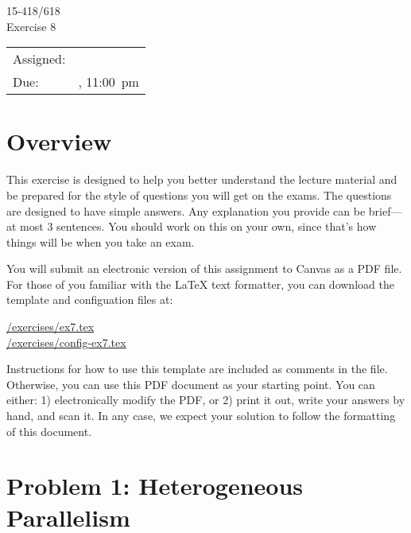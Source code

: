 \documentclass[11pt]{article}
\newcommand{\cref}[2]{\href{#1}{\color{blue}#2}}
\begin{document}
                          
\vspace*{0.3in}                            
\begin{center}
\LARGE
15-418/618 \thisterm{} \\
Exercise 8
\end{center}

\begin{center}
\Large        
\begin{tabular}{ll}
\hline             
Assigned: & \dateassigned{}  \\
Due: &  \datedue{}, 11:00~pm  \\
\hline       
\end{tabular}
\end{center} 

\section*{Overview}

This exercise is designed to help you better understand the lecture
material and be prepared for the style of questions you will get on
the exams.  The questions are designed to have simple answers.  Any
explanation you provide can be brief---at most 3 sentences.  You
should work on this on your own, since that's how things will be when
you take an exam.

You will submit an electronic version of this assignment to Canvas 
as a PDF file.  For those of you familiar with the \LaTeX{} text 
formatter, you can download the template and configuation files at: 
\begin{center} 
  \cref{\actualcoursehome/exercises/ex7.tex}{\visiblecoursehome/exercises/ex7.tex}\\
  \cref{\actualcoursehome/exercises/config-ex7.tex}{\visiblecoursehome/exercises/config-ex7.tex}
\end{center} 
Instructions for how to use this template are included as comments in 
the file.  Otherwise, you can use this PDF document as your starting 
point.  You can either: 1) electronically modify the PDF, or 2) print 
it out, write your answers by hand, and scan it.  In any case, we 
expect your solution to follow the formatting of this document. 

\newpage 

\section*{Problem 1: Heterogeneous Parallelism}
\end{document}
